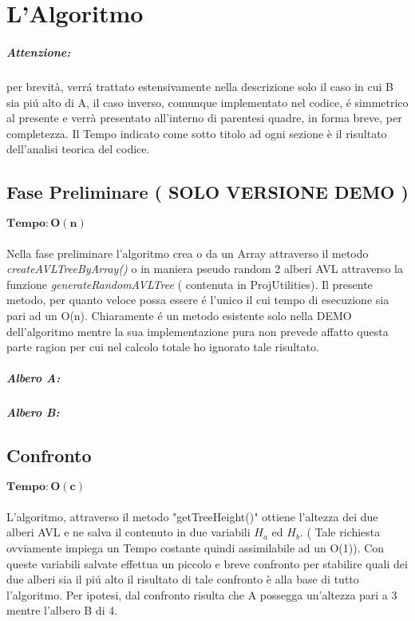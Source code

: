 \chapter{L'Algoritmo}
\paragraph{Attenzione:} per brevità, verr\'a trattato estensivamente nella descrizione solo il caso in cui B sia pi\'u alto di A, il caso inverso, comunque implementato nel codice, \'e simmetrico al presente e verrà presentato all'interno di parentesi quadre, in forma breve, per completezza.
Il Tempo indicato come sotto titolo ad ogni sezione è il risultato dell'analisi teorica del codice.


\section{Fase Preliminare ( SOLO VERSIONE DEMO )}
$\mathbf{Tempo: O(n)}$\\ 	\\
Nella fase preliminare l'algoritmo crea o da un Array attraverso il metodo \emph{createAVLTreeByArray()} o in maniera pseudo random 2 alberi AVL attraverso la funzione \emph{generateRandomAVLTree} ( contenuta in ProjUtilities).
Il presente metodo, per quanto veloce possa essere \'e l'unico il cui tempo di esecuzione sia pari ad un O(n). Chiaramente \'e un metodo esistente solo nella DEMO dell'algoritmo mentre la sua implementazione pura non prevede affatto questa parte ragion per cui nel calcolo totale ho ignorato tale risultato.
\newline
\newline

\paragraph{Albero A:}


\paragraph{\newline Albero B: \newline}


\newpage


\section{Confronto}
$\mathbf{Tempo: O(c)}$\\ 	\\
L'algoritmo, attraverso il metodo "getTreeHeight()" ottiene l'altezza dei due alberi AVL e ne salva il contenuto in due variabili $H_a$ ed $H_b$. ( Tale richiesta ovviamente impiega un Tempo costante quindi assimilabile ad un O(1)). Con queste variabili salvate effettua un piccolo e breve confronto per stabilire quali dei due alberi sia il pi\'u alto il risultato di tale confronto è alla base di tutto l'algoritmo. 
Per ipotesi, dal confronto risulta che A possegga un'altezza pari a 3 mentre l'albero B di 4.

